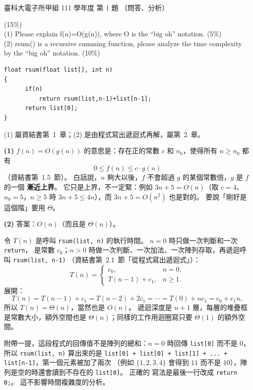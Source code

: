 \begin{pastexam}[label={px:ntust-111-et-ds-01}]{臺科大電子所甲組 111 學年度 第 1 題}
（問答、分析）

(15\%)\\
(1) Please explain f(n)=O(g(n)), where O is the ``big oh'' notation. (5\%)\\
(2) rsum() is a recursive summing function, please analyze the time complexity by the ``big oh''
notation. (10\%)
\begin{verbatim}
float rsum(float list[], int n)
{
      if(n)
          return rsum(list,n-1)+list[n-1];
      return list[0];
}
\end{verbatim}
\end{pastexam}

\begin{pastsoln}
(1) 屬資結書第~1~章；(2) 是由程式寫出遞迴式再解，屬第~2~章。

\textbf{(1)} $f(n) = O(g(n))$ 的意思是：存在正的常數 $c$ 和 $n_0$，使得所有 $n \ge n_0$ 都有
\[
  0 \le f(n) \le c \cdot g(n)
\]
（資結書第~1.5~節）。 白話說，$n$ 夠大以後，$f$ 不會超過 $g$ 的某個常數倍，$g$ 是 $f$ 的一個
\textbf{漸近上界}。 它只是上界，不一定緊：例如 $3n + 5 = O(n)$（取 $c = 4$、$n_0 = 5$，$n \ge 5$ 時
$3n + 5 \le 4n$），而 $3n + 5 = O(n^2)$ 也是對的。 要說「剛好是這個階」要用 $\Theta$。

\textbf{(2)} 答案：$O(n)$（而且是 $\Theta(n)$）。

令 $T(n)$ 是呼叫 \texttt{rsum(list, n)} 的執行時間。 $n = 0$ 時只做一次判斷和一次 \texttt{return}，
是常數 $c_0$；$n > 0$ 時做一次判斷、一次加法、一次陣列存取，再遞迴呼叫 \texttt{rsum(list, n-1)}
（資結書第~2.1~節「從程式寫出遞迴式」）：
\[
  T(n) = \begin{cases} c_0, & n = 0,\\ T(n - 1) + c_1, & n \ge 1. \end{cases}
\]
展開：
\[
  T(n) = T(n-1) + c_1 = T(n-2) + 2c_1 = \cdots = T(0) + n c_1 = c_0 + c_1 n ,
\]
所以 $T(n) = \Theta(n)$，當然也是 $O(n)$。 遞迴深度是 $n + 1$ 層，每層的堆疊框是常數大小，額外空間也是
$\Theta(n)$；同樣的工作用迴圈寫只要 $\Theta(1)$ 的額外空間。

附帶一提，這段程式的回傳值不是陣列的總和：$n = 0$ 時回傳 \texttt{list[0]} 而不是 $0$，所以
\texttt{rsum(list, n)} 算出來的是 \texttt{list[0] + list[0] + list[1] + ... + list[n-1]}，第一個元素被加了兩次
（例如 $\{1, 2, 3, 4\}$ 會得到 $11$ 而不是 $10$），陣列是空的時還會讀到不存在的 \texttt{list[0]}。 正確的
寫法是最後一行改成 \texttt{return 0;}。 這不影響時間複雜度的分析。
\end{pastsoln}
